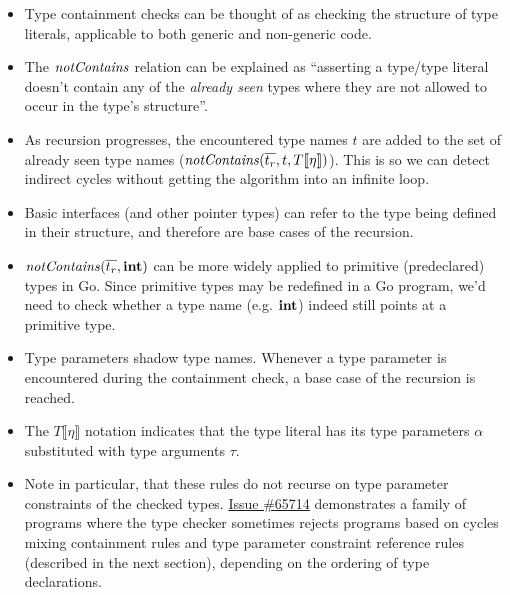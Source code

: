 \documentclass[12pt]{article}
\begin{document}
\begin{itemize}
    \item Type containment checks can be thought of as checking the structure of
          type literals, applicable to both generic and non-generic code.

    \item The $\mathit{notContains}$ relation can be explained as ``asserting a type/type
          literal doesn't contain any of the \emph{already seen} types where they are
          not allowed to occur in the type's structure''.

    \item As recursion progresses, the encountered type names $t$ are added to
          the set of already seen type names ($\mathit{notContains}(\overline{t_r}, t, T
              \llbracket\eta\rrbracket)$). This is so we can detect indirect cycles
          without getting the algorithm into an infinite loop.

    \item Basic interfaces (and other pointer types) can refer to the type being
          defined in their structure, and therefore are base cases of the
          recursion.

    \item $\mathit{notContains}(\overline{t_r}, \texttt{\bf int})$ can be more widely applied to primitive
          (predeclared) types in Go. Since primitive types may be redefined in a Go
          program, we'd need to check whether a type name (e.g. $\texttt{\bf int}$) indeed
          still points at a primitive type.

    \item Type parameters shadow type names. Whenever a type parameter is
          encountered during the containment check, a base case of the recursion is
          reached.

    \item The $T \llbracket\eta\rrbracket$ notation indicates that the type
          literal has its type parameters $\alpha$ substituted with type arguments
          $\tau$.

    \item Note in particular, that these rules do not recurse on type parameter
          constraints of the checked types.
          \href{https://github.com/golang/go/issues/65714}{Issue \#65714}
          demonstrates a family of programs where the type checker sometimes
          rejects programs based on cycles mixing containment rules and type
          parameter constraint reference rules (described in the next section),
          depending on the ordering of type declarations.
\end{itemize}
\end{document}

